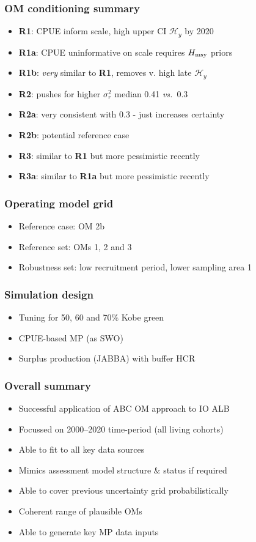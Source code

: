 \documentclass{beamer}
\newcommand{\sigr}{\sigma^2_r}
\newcommand{\hmsy}{H_{\rm msy}}
\newcommand{\vs}{\textit{vs.}~}
\begin{document}
\begin{frame}
    \frametitle{OM conditioning summary}
\begin{itemize}
    \item \textbf{R1}: CPUE inform scale, high upper CI $\mathcal{H}_y$ by 2020
    \item \textbf{R1a}: CPUE uninformative on scale requires $\hmsy$ priors
    \item \textbf{R1b}: \emph{very} similar to \textbf{R1}, removes v. high late $\mathcal{H}_y$
    \item \textbf{R2}: pushes for higher $\sigr$ median 0.41 \vs 0.3
    \item \textbf{R2a}: very consistent with 0.3 - just increases certainty
    \item \textbf{R2b}: potential reference case
    \item \textbf{R3}: similar to \textbf{R1} but more pessimistic recently
    \item \textbf{R3a}: similar to \textbf{R1a} but more pessimistic recently 
\end{itemize}
\end{frame}

\begin{frame}
    \frametitle{Operating model grid}
\begin{itemize}
    \item Reference case: OM 2b
    \item Reference set: OMs 1, 2 and 3
    \item Robustness set: low recruitment period, lower sampling area 1
\end{itemize}
\end{frame}

\begin{frame}
    \frametitle{Simulation design}
\begin{itemize}
    \item Tuning for 50, 60 and 70$\%$ Kobe green
    \item CPUE-based MP (as SWO)
    \item Surplus production (JABBA) with buffer HCR
\end{itemize}
\end{frame}

\begin{frame}
    \frametitle{Overall summary}
\begin{itemize}
    \item Successful application of ABC OM approach to IO ALB 
    \item Focussed on 2000--2020 time-period (all living cohorts)
    \item Able to fit to all key data sources
    \item Mimics assessment model structure \& status if required
    \item Able to cover previous uncertainty grid probabilistically
    \item Coherent range of plausible OMs
    \item Able to generate key MP data inputs
\end{itemize}
\end{frame}
\end{document}
